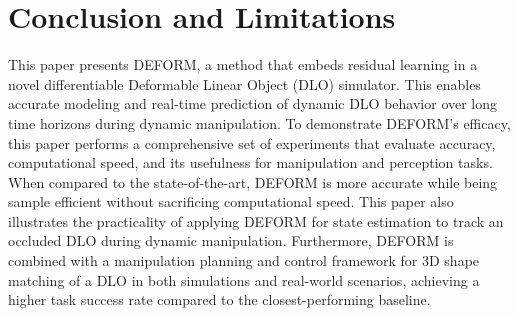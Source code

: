 \documentclass{article}
\begin{document}

\section{Conclusion and Limitations}
\label{sec:conclusion}

This paper presents DEFORM, a method that embeds residual learning in a novel differentiable Deformable Linear Object (DLO) simulator.
This enables accurate modeling and real-time prediction of dynamic DLO behavior over long time horizons during dynamic manipulation.
To demonstrate DEFORM's efficacy, this paper performs a comprehensive set of experiments that evaluate accuracy, computational speed, and its usefulness for manipulation and perception tasks. 
When compared to the state-of-the-art, DEFORM is more accurate while being sample efficient without sacrificing computational speed.
This paper also illustrates the practicality of applying DEFORM for state estimation to track an occluded DLO during dynamic manipulation. 
Furthermore, DEFORM is combined with a manipulation planning and control framework for 3D shape matching of a DLO in both simulations and real-world scenarios, achieving a higher task success rate compared to the closest-performing baseline.
\end{document}
